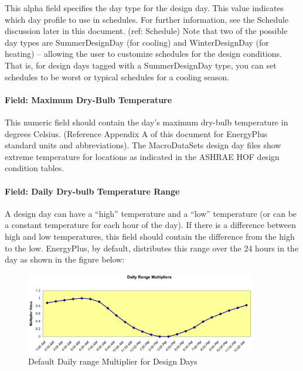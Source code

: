This alpha field specifies the day type for the design day. This value indicates which day profile to use in schedules. For further information, see the Schedule discussion later in this document. (ref: Schedule) Note that two of the possible day types are SummerDesignDay (for cooling) and WinterDesignDay (for heating) -- allowing the user to customize schedules for the design conditions. That is, for design days tagged with a SummerDesignDay type, you can set schedules to be worst or typical schedules for a cooling season.

\paragraph{Field: Maximum Dry-Bulb Temperature}\label{field-maximum-dry-bulb-temperature}

This numeric field should contain the day's maximum dry-bulb temperature in degrees Celsius. (Reference Appendix A of this document for EnergyPlus standard units and abbreviations). The MacroDataSets design day files show extreme temperature for locations as indicated in the ASHRAE HOF design condition tables.

\paragraph{Field: Daily Dry-bulb Temperature Range}\label{field-daily-dry-bulb-temperature-range}

A design day can have a ``high'' temperature and a ``low'' temperature (or can be a constant temperature for each hour of the day). If there is a difference between high and low temperatures, this field should contain the difference from the high to the low. EnergyPlus, by default, distributes this range over the 24 hours in the day as shown in the figure below:

\begin{figure}[hbtp] %
\centering
\includegraphics[width=0.9\textwidth, height=0.9\textheight, keepaspectratio=true]{media/image010.png}
\caption{Default Daily range Multiplier for Design Days \protect \label{fig:default-daily-range-multiplier-for-design}}
\end{figure}


